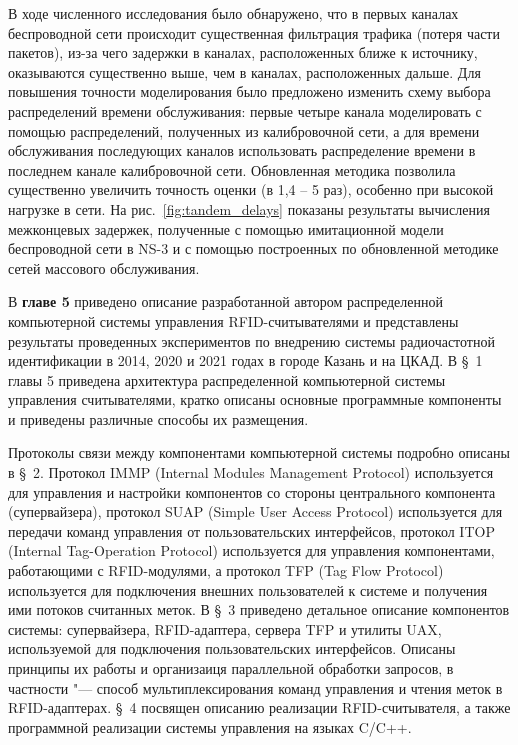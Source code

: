 В ходе численного исследования было обнаружено, что в первых каналах беспроводной сети происходит существенная фильтрация трафика (потеря части пакетов), из-за чего задержки в каналах, расположенных ближе к источнику, оказываются существенно выше, чем в каналах, расположенных дальше. Для повышения точности моделирования было предложено изменить схему выбора распределений времени обслуживания: первые четыре канала моделировать с помощью распределений, полученных из калибровочной сети, а для времени обслуживания последующих каналов использовать распределение времени в последнем канале калибровочной сети. Обновленная методика позволила существенно увеличить точность оценки (в 1,4 -- 5 раз), особенно при высокой нагрузке в сети. На рис.~\ref{fig:tandem_delays} показаны результаты вычисления межконцевых задержек, полученные с помощью имитационной модели беспроводной сети в NS-3 и с помощью построенных по обновленной методике сетей массового обслуживания.



В \textbf{главе 5}
приведено описание разработанной автором распределенной компьютерной системы управления RFID-считывателями и представлены результаты проведенных экспериментов по внедрению системы радиочастотной идентификации в 2014, 2020 и 2021 годах в городе Казань и на ЦКАД. В \S~1 главы 5 приведена архитектура распределенной компьютерной системы управления считывателями, кратко описаны основные программные компоненты и приведены различные способы их размещения.

Протоколы связи между компонентами компьютерной системы подробно описаны в \S~2. Протокол IMMP (Internal Modules Management Protocol) используется для управления и настройки компонентов со стороны центрального компонента (супервайзера), протокол SUAP (Simple User Access Protocol) используется для передачи команд управления от пользовательских интерфейсов, протокол ITOP (Internal Tag-Operation Protocol) используется для управления компонентами, работающими с RFID-модулями, а протокол TFP (Tag Flow Protocol) используется для подключения внешних пользователей к системе и получения ими потоков считанных меток.  В \S~3 приведено детальное описание компонентов системы: супервайзера, RFID-адаптера, сервера TFP и утилиты UAX, используемой для подключения пользовательских интерфейсов. Описаны принципы их работы и организаиця параллельной обработки запросов, в частности "--- способ мультиплексирования команд управления и чтения меток в RFID-адаптерах. \S~4 посвящен описанию реализации RFID-считывателя, а также программной реализации системы управления на языках C/C++.

